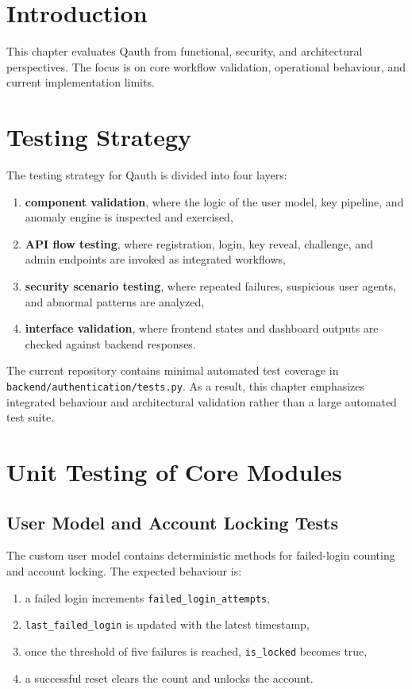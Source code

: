 \documentclass[12pt,a4paper]{report}
\begin{document}
\section{Introduction}
This chapter evaluates Qauth from functional, security, and architectural perspectives. The focus is on core workflow validation, operational behaviour, and current implementation limits.

\section{Testing Strategy}
The testing strategy for Qauth is divided into four layers:

\begin{enumerate}
    \item \textbf{component validation}, where the logic of the user model, key pipeline, and anomaly engine is inspected and exercised,
    \item \textbf{API flow testing}, where registration, login, key reveal, challenge, and admin endpoints are invoked as integrated workflows,
    \item \textbf{security scenario testing}, where repeated failures, suspicious user agents, and abnormal patterns are analyzed,
    \item \textbf{interface validation}, where frontend states and dashboard outputs are checked against backend responses.
\end{enumerate}

The current repository contains minimal automated test coverage in \texttt{backend/authentication/tests.py}. As a result, this chapter emphasizes integrated behaviour and architectural validation rather than a large automated test suite.

\section{Unit Testing of Core Modules}

\subsection{User Model and Account Locking Tests}
The custom user model contains deterministic methods for failed-login counting and account locking. The expected behaviour is:

\begin{enumerate}
    \item a failed login increments \texttt{failed\_login\_attempts},
    \item \texttt{last\_failed\_login} is updated with the latest timestamp,
    \item once the threshold of five failures is reached, \texttt{is\_locked} becomes true,
    \item a successful reset clears the count and unlocks the account.
\end{enumerate}
\end{document}

